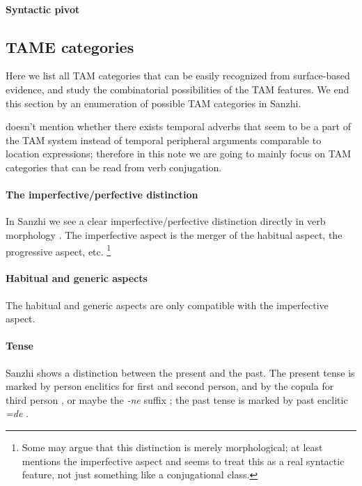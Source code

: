 \documentclass[a4paper, oneside, 12pt]{report}
\newcommand*{\citepage}[1]{p.~{#1}}
\newcommand{\form}[1]{\emph{#1}}
\begin{document}
\paragraph*{Syntactic pivot} 

\subsection{TAME categories} 

Here we list all TAM categories that can be easily recognized from surface-based evidence, 
and study the combinatorial possibilities of the TAM features.
We end this section by an enumeration of possible TAM categories in Sanzhi.

\citet{forker2020grammar} doesn't mention whether there exists 
temporal adverbs that seem to be a part of the TAM system 
instead of temporal peripheral arguments comparable to location expressions; 
therefore in this note we are going to mainly focus on TAM categories 
that can be read from verb conjugation.

\paragraph*{The imperfective/perfective distinction} 
In Sanzhi we see a clear imperfective/perfective distinction directly in verb morphology 
\citep[\citepage{206}]{forker2020grammar}. 
The imperfective aspect is the merger of the habitual aspect, the progressive aspect, etc.%
\footnote{
    Some may argue that this distinction is merely morphological; 
    at least \citet[\citepage{206}]{forker2020grammar} mentions the imperfective aspect 
    and seems to treat this as a real syntactic feature, 
    not just something like a conjugational class. 
}

\paragraph*{Habitual and generic aspects} 
The habitual and generic aspects are only compatible with the imperfective aspect.


\paragraph*{Tense} Sanzhi shows a distinction between the present and the past.
The present tense is marked by 
person enclitics for first and second person, 
and by the copula for third person \citep[\citepage{250}]{forker2020grammar},
or maybe the \form{-ne} suffix \citep[\citepage{253}]{forker2020grammar};
the past tense is marked by past enclitic \form{=de} \citep[\citepage{252}]{forker2020grammar}.
\end{document}
